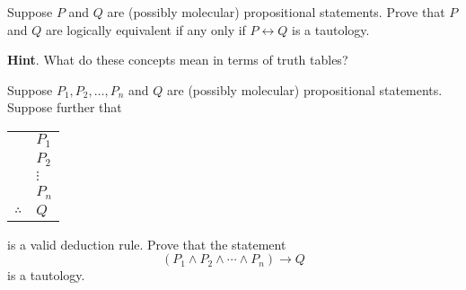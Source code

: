 \documentclass[11pt,]{book}
\theoremstyle{ptxplainnotitle}
\theoremstyle{ptxplaintitle}
\theoremstyle{ptxdefinitionnotitle}
\theoremstyle{ptxdefinitiontitle}
\theoremstyle{ptxdefinitionnotitle}
\theoremstyle{ptxdefinitiontitle}
\theoremstyle{ptxdefinitionnotitle}
\theoremstyle{ptxdefinitiontitle}
\theoremstyle{ptxdefinitiontitlenonumber}
\theoremstyle{ptxdefinitiontitlenonumber}
\numberwithin{equation}{chapter}
\newcommand{\hrulethin}  {\noalign{\hrule height 0.04em}}
\renewcommand{\iff}{\leftrightarrow}
\newcommand{\imp}{\rightarrow}
\begin{document}
\begin{divisionexercise}{15}\hypertarget{exercise-175}{}
\hypertarget{p-2268}{}%
Suppose \(P\) and \(Q\) are (possibly molecular) propositional statements.  Prove that \(P\) and \(Q\) are logically equivalent if any only if \(P \iff Q\) is a tautology.%
\par\smallskip%
\noindent\textbf{Hint}.\hypertarget{hint-16}{}\quad%
\hypertarget{p-2269}{}%
What do these concepts mean in terms of truth tables?%
\end{divisionexercise}%
\begin{divisionexercise}{16}\hypertarget{exercise-176}{}
\hypertarget{p-2270}{}%
Suppose \(P_1, P_2, \ldots, P_n\) and \(Q\) are (possibly molecular) propositional statements.  Suppose further that%
\begin{sidebyside}{1}{0}{0}{0}
\begin{sbspanel}{1}
{\centering%
\begin{tabular}{ll}
&\(P_1\)\tabularnewline[0pt]
&\(P_2\)\tabularnewline[0pt]
&\(\vdots\)\tabularnewline[0pt]
&\(P_n\)\tabularnewline\hrulethin
\(\therefore\)&\(Q\)
\end{tabular}
\par}
\end{sbspanel}
\end{sidebyside}
\par
\hypertarget{p-2271}{}%
is a valid deduction rule.  Prove that the statement%
\begin{equation*}
(P_1 \wedge P_2 \wedge \cdots \wedge P_n) \imp Q
\end{equation*}
is a tautology.%
\end{divisionexercise}%
\typeout{************************************************}
\typeout{************************************************}
\end{document}
